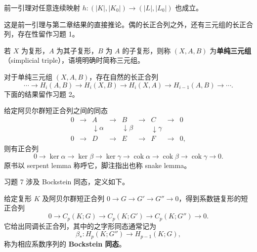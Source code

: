 前一引理对任意连续映射 $h:(|K|,|K_0|)\to(|L|,|L_0|)$ 也成立。

这是前一引理与第二章结果的直接推论。偶的长正合列之外，还有三元组的长正合列，存在性留作习题 1。

若 $X$ 为复形，$A$ 为其子复形，$B$ 为 $A$ 的子复形，则称 $(X,A,B)$ 为\textbf{单纯三元组}（simplicial triple），语境明确时简称三元组。

对于单纯三元组 $(X,A,B)$，存在自然的长正合列
\[
\cdots\to H_i(A,B)\to H_i(X,B)\to H_i(X,A)\to H_{i-1}(A,B)\to\cdots.
\]
下面的结果留作习题 2。

给定阿贝尔群短正合列之间的同态
\[
\begin{array}{ccccccccc}
0&\to&A&\to&B&\to&C&\to&0\\
&&\downarrow\scriptstyle\alpha&&\downarrow\scriptstyle\beta&&\downarrow\scriptstyle\gamma\\
0&\to&D&\to&E&\to&F&\to&0,
\end{array}
\]
则有正合列
\[
0\to\ker\alpha\to\ker\beta\to\ker\gamma\to
\operatorname{cok}\alpha\to\operatorname{cok}\beta\to\operatorname{cok}\gamma\to0.
\]
原书以 serpent lemma 称呼它，脚注指出也称 snake lemma。

习题 7 涉及 Bockstein 同态，定义如下。

给定复形 $K$ 及阿贝尔群短正合列 $0\to G\to G'\to G''\to0$，得到系数链复形的短正合列
\[
0\to C_p(K;G)\to C_p(K;G')\to C_p(K;G'')\to0.
\]
它给出同调长正合列，其中的之字形同态通常记为
\[
\beta_*:H_p(K;G'')\to H_{p-1}(K;G),
\]
称为相应系数序列的 \textbf{Bockstein 同态}。

